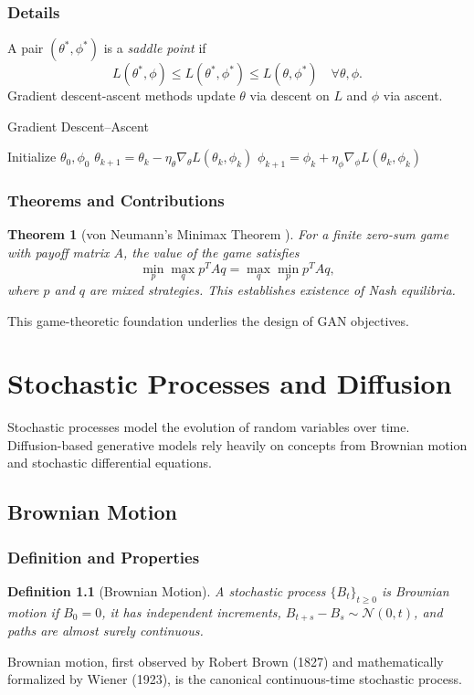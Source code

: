 \documentclass[11pt]{book}
\newtheorem{theorem}{Theorem}[chapter]
\newtheorem{definition}{Definition}[chapter]
\begin{document}
\subsection{Details}
A pair $(\theta^*,\phi^*)$ is a \emph{saddle point} if
\begin{equation}
L(\theta^*,\phi)\le L(\theta^*,\phi^*)\le L(\theta,\phi^*)\quad\forall\theta,\phi.
\end{equation}
Gradient descent-ascent methods update $\theta$ via descent on $L$ and $\phi$ via ascent.

\begin{algorithm}
\caption{Gradient Descent--Ascent}
\begin{algorithmic}[1]
\STATE Initialize $\theta_0, \phi_0$
    \STATE $\theta_{k+1}=\theta_k-\eta_\theta\nabla_{\theta}L(\theta_k,\phi_k)$
    \STATE $\phi_{k+1}=\phi_k+\eta_\phi\nabla_{\phi}L(\theta_k,\phi_k)$
\ENDFOR
\end{algorithmic}
\end{algorithm}

\subsection{Theorems and Contributions}
\begin{theorem}[von Neumann's Minimax Theorem \cite{vonneumann1928}]
For a finite zero-sum game with payoff matrix $A$, the value of the game satisfies
\begin{equation}
\min_{p}\max_{q} p^T A q = \max_{q}\min_{p} p^T A q,
\end{equation}
where $p$ and $q$ are mixed strategies. This establishes existence of Nash equilibria.
\end{theorem}
This game-theoretic foundation underlies the design of GAN objectives.

\chapter{Stochastic Processes and Diffusion}
Stochastic processes model the evolution of random variables over time. Diffusion-based generative models rely heavily on concepts from Brownian motion and stochastic differential equations.

\section{Brownian Motion}
\subsection{Definition and Properties}
\begin{definition}[Brownian Motion]
A stochastic process $\{B_t\}_{t\ge0}$ is Brownian motion if $B_0=0$, it has independent increments, $B_{t+s}-B_s\sim\mathcal{N}(0,t)$, and paths are almost surely continuous.
\end{definition}
Brownian motion, first observed by Robert Brown (1827) and mathematically formalized by Wiener (1923), is the canonical continuous-time stochastic process.
\end{document}
